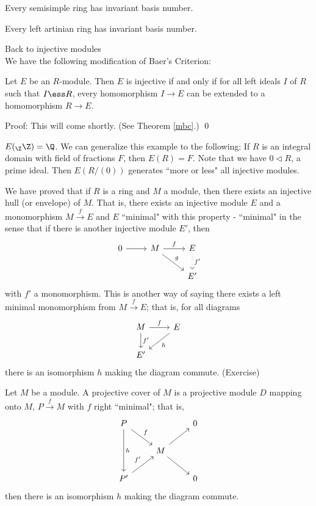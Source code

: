 \begin{cor}
Every semisimple ring has invariant basis number.
\end{cor}

\begin{cor}
Every left artinian ring has invariant basis number.
\end{cor}


Back to injective modules \\

We have the following modification of Baer's Criterion:

\begin{thm}
Let $E$ be an $R$-module. Then $E$ is injective if and only if for all left ideals $I$ of $R$ such that $I \ess R$, every homomorphism $I \rightarrow E$ can be extended to a homomorphism $R \rightarrow E$.
\end{thm}

Proof: This will come shortly. (See Theorem \ref{mbc}.) \qed \\

\begin{ex}
$E(_\Z \Z)=\Q$. We can generalize this example to the following: If $R$ is an integral domain with field of fractions $F$, then $E(R)=F$. Note that we have $0 \lhd R$, a prime ideal. Then $E(R/(0))$ generates ``more or less" all injective modules. 
\end{ex}

We have proved that if $R$ is a ring and $M$ a module, then there exists an injective hull (or envelope) of $M$. That is, there exists an injective module $E$ and a monomorphism $M \stackrel{f}{\rightarrow} E$ and $E$ ``minimal" with this property - ``minimal" in the sense that if there is another injective module $E'$, then
\[
\begin{tikzcd}
0 \arrow{r} & M \arrow{r}{f} \arrow{dr}{g} & E \arrow[dotted]{d}{f'} \\
 & & E'
\end{tikzcd}
\]
with $f'$ a monomorphism. This is another way of saying there exists a left minimal monomorphism from $M \stackrel{f}{\rightarrow} E$; that is, for all diagrams
\[
\begin{tikzcd}
M \arrow{r}{f} \arrow{d}{f'} & E \arrow{dl}{h} \\
E' & 
\end{tikzcd}
\]
there is an isomorphism $h$ making the diagram commute. (Exercise) 

\begin{rem}
Let $M$ be a module. A projective cover of $M$ is a projective module $D$ mapping onto $M$, $P \stackrel{f}{\rightarrow} M$ with $f$ right ``minimal"; that is, 
\[
\begin{tikzcd}
P \arrow{dr}{f} \arrow{dd}{h} & & 0 \\
& M \arrow{ru} \arrow{dr} & \\
P' \arrow{ru}{f'} & & 0  
\end{tikzcd}
\]
then there is an isomorphism $h$ making the diagram commute.
\end{rem}

